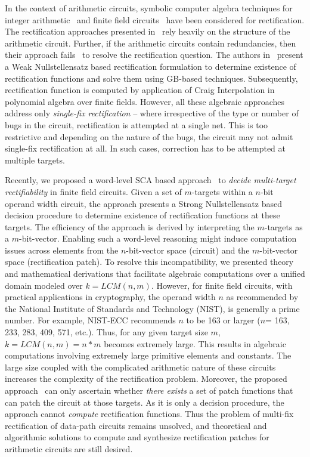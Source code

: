 In the context of arithmetic circuits, symbolic computer algebra 
techniques for integer arithmetic~\cite{farimah:2016:1,farimah:2017:1,
MF_Rolf:ISVLSI18} and finite field circuits~\cite{Utkarsh:ETS19,
Utkarsh:VLSI18,Vkrao:FMCAD18} have been considered for rectification. 
The rectification approaches presented in~\cite{farimah:2016:1,farimah:2017:1} 
rely heavily on the structure of the arithmetic circuit. Further,
if the arithmetic circuits contain redundancies, then their approach 
fails~\cite{farimah_cex} to resolve the rectification question. 
The authors in~\cite{Utkarsh:ETS19,Utkarsh:VLSI18} present a Weak 
Nullstellensatz based rectification formulation to determine existence 
of rectification functions and solve them using GB-based techniques. 
Subsequently, rectification function is computed by application of 
Craig Interpolation in polynomial algebra over finite fields. 
However, all these algebraic approaches address only {\it single-fix 
rectification} -- where irrespective of the type or number of bugs 
in the circuit, rectification is attempted at a single net. This is 
too restrictive and depending on the nature of the bugs, the circuit 
may not admit single-fix rectification at all. In such cases, 
correction has to be attempted at multiple targets.

Recently, we proposed a word-level SCA based approach~\cite{Vkrao:ISQED21} 
to {\it decide multi-target rectifiability} in finite field circuits. 
Given a set of $m$-targets within a $n$-bit operand width circuit, 
the approach presents a Strong Nullstellensatz based decision procedure
to determine existence of rectification functions at these targets.
The efficiency of the approach is derived by interpreting the $m$-targets
as a $m$-bit-vector. Enabling such a word-level reasoning might induce 
computation issues across elements from the $n$-bit-vector space (circuit) 
and the $m$-bit-vector space (rectification patch). To resolve this
incompatibility, we presented theory and mathematical derivations that
facilitate algebraic computations over a unified domain modeled over 
$k=LCM(n,m)$. However, for finite field circuits, with practical applications 
in cryptography, the operand width $n$ as recommended by the National 
Institute of Standards and Technology (NIST), is generally a prime number. 
For example, NIST-ECC recommends $n$ to be 163 or larger 
($n$= 163, 233, 283, 409, 571, etc.). Thus, for any given target size $m$, 
$k=LCM(n,m)=n*m$ becomes extremely large. This results in algebraic 
computations involving extremely large primitive elements and constants.
The large size coupled with the complicated arithmetic nature of these 
circuits increases the complexity of the rectification problem.
Moreover, the proposed approach~\cite{Vkrao:ISQED21} can only ascertain 
whether {\it there exists} a set of patch functions that can patch the 
circuit at those targets. As it is only a decision procedure, the 
approach cannot {\it compute} rectification functions. Thus the problem 
of multi-fix rectification of data-path circuits remains unsolved, and 
theoretical and algorithmic solutions to compute and synthesize 
rectification patches for arithmetic circuits are still desired.

